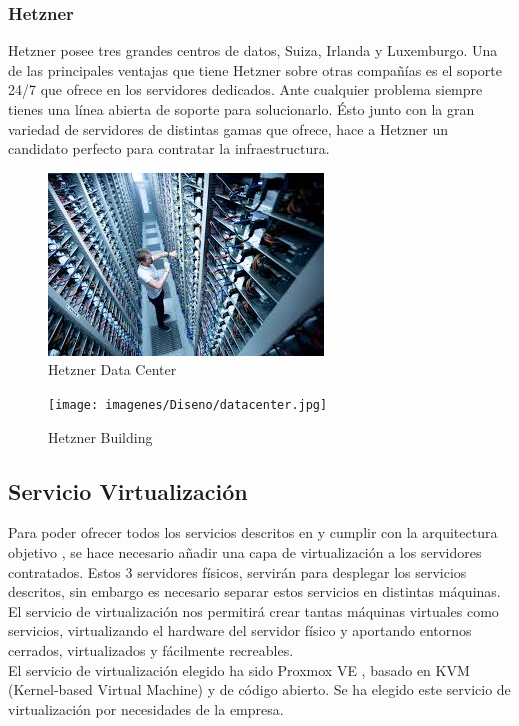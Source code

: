 		\subsubsection{Hetzner}
		\begin{text}
			Hetzner posee tres grandes centros de datos, Suiza, Irlanda y Luxemburgo. Una de las principales ventajas que tiene Hetzner sobre otras compañías es el soporte 24/7 que ofrece en los servidores dedicados. Ante cualquier problema siempre tienes una línea abierta de soporte para solucionarlo. Ésto junto con la gran variedad de servidores de distintas gamas que ofrece, hace a Hetzner un candidato perfecto para contratar la infraestructura.
			
			\begin{figure}[!hbt]
				\centering
				\includegraphics[scale=0.75]{imagenes/Diseno/baremetal.jpeg}
				\caption[Hetzner Data Center]{Hetzner Data Center \cite{hetzner:online}} 
				\label{Hetzner Data Center}
			\end{figure} 
		
			\begin{figure}[!hbt]
				\centering
				\texttt{[image: imagenes/Diseno/datacenter.jpg]}
				\caption[Hetzner Building]{Hetzner Building \cite{hetzner:online}} 
				\label{Hetzner Building}
				\end{figure} 
			\end{text}
		
	\subsection{Servicio Virtualización}
		\begin{text}
			Para poder ofrecer todos los servicios descritos en  y cumplir con la arquitectura objetivo , se hace necesario añadir una capa de virtualización a los servidores contratados. Estos 3 servidores físicos, servirán para desplegar los servicios descritos, sin embargo es necesario separar estos servicios en distintas máquinas. El servicio de virtualización nos permitirá crear tantas máquinas virtuales como servicios, virtualizando el hardware del servidor físico y aportando entornos cerrados, virtualizados y fácilmente recreables. \\
			El servicio de virtualización elegido ha sido Proxmox VE \cite{proxmox:online}, basado en KVM (Kernel-based Virtual Machine) y de código abierto. Se ha elegido este servicio de virtualización por necesidades de la empresa.
		\end{text}
